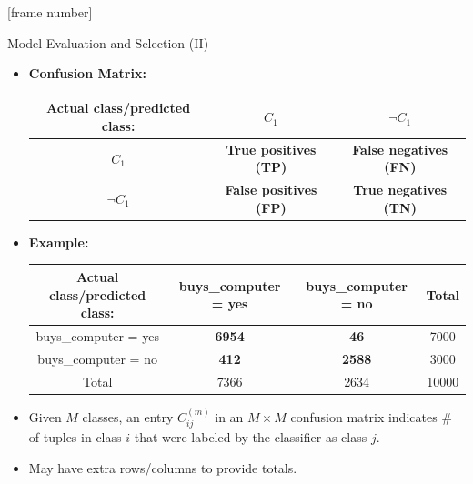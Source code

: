 \documentclass[aspectratio=169,t,table]{beamer}
\begin{document}
  {
    [frame number]
    \begin{frame}{Model Evaluation and Selection (II)}
        \begin{itemize}
          \item \textbf{Confusion Matrix:}\\[0.2cm]
          \begin{tabular}{|c|c|c|}
            \hline
            Actual class/predicted class: & $C_1$ & $\neg C_1$ \\\hline
            $C_1$ & \textbf{True positives (TP)} & \textbf{False negatives (FN)} \\\hline
            $\neg C_1$ & \textbf{False positives (FP)} & \textbf{True negatives (TN)} \\\hline
          \end{tabular}
          \item \textbf{Example:}\\[0.2cm]
          \begin{tabular}{|c|c|c|c|}
            \hline
            Actual class/predicted class: & buys\_computer = yes & buys\_computer = no & Total \\\hline
            buys\_computer = yes & \textbf{6954} & \textbf{46} & 7000 \\\hline
            buys\_computer = no & \textbf{412} & \textbf{2588} & 3000 \\\hline
            Total & 7366 & 2634 & 10000 \\\hline
          \end{tabular}
          \item Given $M$ classes, an entry $C^{(m)}_{ij}$ in an $M \times M$ confusion matrix indicates \# of tuples in class $i$ that were labeled by the classifier as class $j$.
          \item May have extra rows/columns to provide totals.
      \end{itemize}
    \end{frame}
  }
\end{document}
